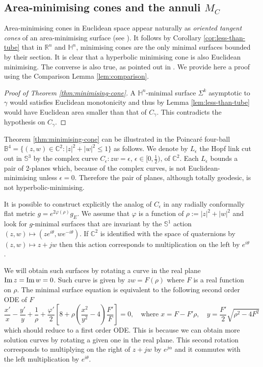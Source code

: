 \documentclass[11pt]{article}
\newcommand{\im}{\mathop{\rm Im}\nolimits}
\begin{document}
\subsection{Area-minimising cones and the annuli \(M_C\)}
\label{sec:org013f532}
Area-minimising cones in Euclidean space appear naturally as \emph{oriented tangent cones} of an
area-minimising surface (see \cite{Morgan16_GeometricMeasureTheory}). It follows by
Corollary \ref{cor:less-than-tube} that in \(\mathbb{R}^n\) and \(\mathbb{H}^n\),
minimising cones are the only minimal surfaces bounded by their section. 
It is clear that a hyperbolic minimising cone is
also Euclidean minimising. The converse is also true, as pointed out in
\cite{Anderson82_CompleteMinimalVarieties}. We provide here a proof using the Comparison
Lemma \ref{lem:comparison}.

\begin{proof}[Proof of Theorem \ref{thm:minimising-cone}]
A \(\mathbb{H}^n\)-minimal surface \(\Sigma^k\) asymptotic to \(\gamma\) would satisfies Euclidean
monotonicity and thus by Lemma \ref{lem:less-than-tube} would have Euclidean area smaller
than that of \(C_\gamma\). This contradicts the hypothesis on \(C_\gamma\).
\end{proof}

Theorem \ref{thm:minimising-cone} can be illustrated in the Poincaré four-ball \(\mathbb{B}^4=\{(z,w)\in \mathbb{C}^2:|z|^2+|w|^2 \leq 1\}\) as follows. We denote by \(L_\epsilon\)
the Hopf link cut out in \(\mathbb{S}^3\) by the complex curve \(C_\epsilon: zw=\epsilon\), \(\epsilon\in [0, \frac{1}{2})\), of \(\mathbb{C}^2\). Each \(L_\epsilon\) bounds a
pair of 2-planes which, because of the complex curves, is not
Euclidean-minimising unless \(\epsilon=0\). Therefore the pair of planes, although
totally geodesic, is not hyperbolic-minimising.

It is possible to construct explicitly the analog of \(C_\epsilon\) in any radially
conformally flat metric \(g =
e^{2\varphi(\rho)} g_E\). We assume that \(\varphi\) is a function of \(\rho:=|z|^2 + |w|^2\) and look for \(g\)-minimal surfaces 
that are invariant by the \(\mathbb{S}^1\) action \((z,w)\mapsto(ze^{i\theta}, we^{-i\theta})\). If \(\mathbb{C}^2\) is identified with the
space of quaternions by \((z,w) \mapsto z + jw\) then this action corresponds to
multiplication on the left by \(e^{i\theta}\). 

We will obtain such surfaces by rotating a curve in the real plane \(\im z = \im w = 0\). Such curve is given by \(zw = F(\rho)\) 
where \(F\) is a real function on \(\rho\). The minimal surface
equation is equivalent to the following second order ODE of \(F\)
\[
 \frac{x'}{x} - \frac{y'}{y} + \frac{1}{\rho} +
\frac{\varphi'}{2}\left[8+\rho\left(\frac{x^2}{y^2}-4\right)\frac{F'}{F}
\right]=0,\quad\text{where }x=F-F'\rho,\quad y = \frac{F'}{2}\sqrt{\rho^2 - 4F^2}
\]
which should reduce to a first order ODE. This is because we can obtain more solution
curves by rotating a given one in the real plane. This second rotation corresponds to 
multiplying on the right of \(z+jw\) by \(e^{j\alpha}\) and it commutes with the left
multiplication by \(e^{i\theta}\).
\end{document}
